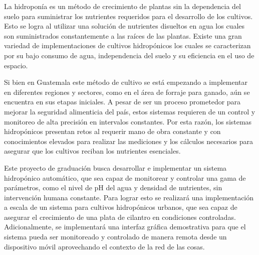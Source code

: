 La hidroponía es un método de crecimiento de plantas sin la dependencia del suelo para suministrar los nutrientes requeridos para el desarrollo de los cultivos. Esto se logra al utilizar una solución de nutrientes disueltos en agua los cuales son suministrados constantemente a las raíces de las plantas. Existe una gran variedad de implementaciones de cultivos hidropónicos los cuales se caracterizan por su bajo consumo de agua, independencia del suelo y su eficiencia en el uso de espacio.

Si bien en Guatemala este método de cultivo se está empezando a implementar en diferentes regiones y sectores, como en el área de forraje para ganado, aún se encuentra en sus etapas iniciales. A pesar de ser un proceso prometedor para mejorar la seguridad alimenticia del país, estos sistemas requieren de un control y monitoreo de alta precisión en intervalos constantes. Por esta razón, los sistemas hidropónicos presentan retos al requerir mano de obra constante y con conocimientos elevados para realizar las mediciones y los cálculos necesarios para asegurar que los cultivos reciban los nutrientes esenciales.

Este proyecto de graduación busca desarrollar e implementar un sistema hidropónico automático, que sea capaz de monitorear y controlar una gama de parámetros, como el nivel de pH del agua y densidad de nutrientes, sin intervención humana constante. Para lograr esto se realizará una implementación a escala de un sistema para cultivos hidropónicos urbanos, que sea capaz de asegurar el crecimiento de una plata de cilantro en condiciones controladas. Adicionalmente, se implementará una interfaz gráfica demostrativa para que el sistema pueda ser monitoreado y controlado de manera remota desde un dispositivo móvil aprovechando el contexto de la red de las cosas.